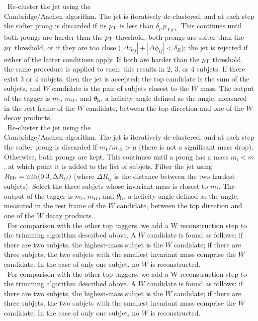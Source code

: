 ~Re-cluster the jet using the \\Cambridge/Aachen algorithm. The jet is iteratively de-clustered, and at each step the softer prong is discarded if its $p_{\rm T}$ is less than $\delta_p\,p_{\mathrm{T\,jet}}$. This continues until both prongs are harder than the $p_{\rm T}$ threshold, both prongs are softer than the $p_{\rm T}$ threshold, or if they are too close ($|\Delta\eta_{ij}|+|\Delta\phi_{ij}|<\delta_R$); the jet is rejected if either of the latter conditions apply. If both are harder than the $p_{\rm T}$ threshold, the same procedure is applied to each: this results in 2, 3, or 4 subjets. If there exist 3 or 4 subjets, then the jet is accepted: the top candidate is the sum of the subjets, and $W$ candidate is the pair of subjets closest to the $W$ mass. The output of the tagger is $m_t$, $m_W$, and $\theta_{\rm h}$, a helicity angle defined as the angle, measured in the rest frame of the $W$ candidate, between the top direction and one of the $W$ decay products.\\

~Re-cluster the jet using the \\Cambridge/Aachen algorithm. The jet is iteratively de-clustered, and at each step the softer prong is discarded if $m_1/m_{12}>\mu$ (there is not a significant mass drop). Otherwise, both prongs are kept. This continues until a prong has a mass $m_i < m$, at which point it is added to the list of subjets. Filter the jet using $R_{\rm filt}=\mathrm{min}(0.3,\Delta R_{ij})$ (where $\Delta R_{ij}$ is the distance between the two hardest subjets). Select the three subjets whose invariant mass is closest to $m_t$. The output of the tagger is $m_t$, $m_W$, and $\theta_{\rm h}$, a helicity angle defined as the angle, measured in the rest frame of the $W$ candidate, between the top direction and one of the $W$ decay products.\\

~For comparison with the other top taggers, we add a W reconstruction step to the trimming algorithm described above. A $W$ candidate is found as follows: if there are two subjets, the highest-mass subjet is the $W$ candidate; if there are three subjets, the two subjets with the smallest invariant mass comprise the $W$ candidate. In the case of only one subjet, no $W$ is reconstructed.\\

~For comparison with the other top taggers, we add a W reconstruction step to the trimming algorithm described above. A $W$ candidate is found as follows: if there are two subjets, the highest-mass subjet is the $W$ candidate; if there are three subjets, the two subjets with the smallest invariant mass comprise the $W$ candidate. In the case of only one subjet, no $W$ is reconstructed.


